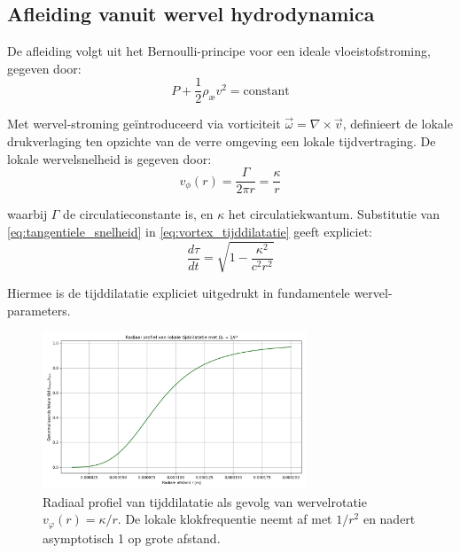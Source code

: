 \subsection{Afleiding vanuit wervel hydrodynamica}

De afleiding volgt uit het Bernoulli-principe voor een ideale vloeistofstroming, gegeven door:
\begin{equation}\label{eq:Bernoulli}
    P + \frac{1}{2}\rho_\text{\ae} v^2 = \text{constant}
\end{equation}

Met wervel-stroming geïntroduceerd via vorticiteit $\vec{\omega} = \nabla \times \vec{v}$, definieert de lokale drukverlaging ten opzichte van de verre omgeving een lokale tijdvertraging. De lokale wervelsnelheid is gegeven door:
\begin{equation}\label{eq:tangentiele_snelheid}
    v_{\phi}(r) = \frac{\Gamma}{2\pi r} = \frac{\kappa}{r}
\end{equation}

waarbij $\Gamma$ de circulatieconstante is, en $\kappa$ het circulatiekwantum. Substitutie van \eqref{eq:tangentiele_snelheid} in \eqref{eq:vortex_tijddilatatie} geeft expliciet:
\begin{equation}\label{eq:vortex_tijd_expliciet}
    \frac{d\tau}{dt} = \sqrt{1 - \frac{\kappa^2}{c^2 r^2}}
\end{equation}

Hiermee is de tijddilatatie expliciet uitgedrukt in fundamentele wervel-parameters.

\begin{figure}[H]
  \centering
  \includegraphics[width=0.7\textwidth]{02-RadialProfileOfLocalTimeDilation_Radial_LocalTime_Dilation_nl}
  \caption{Radiaal profiel van tijddilatatie als gevolg van wervelrotatie \( v_\varphi(r) = \kappa / r \). De lokale klokfrequentie neemt af met \(1/r^2\) en nadert asymptotisch 1 op grote afstand.}
  \label{fig:radiale_tijddilatatie}
\end{figure}


